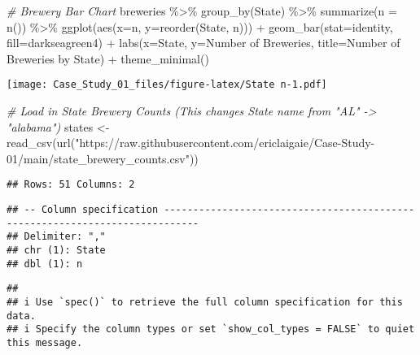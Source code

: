 \documentclass[
]{article}
\newenvironment{Shaded}{\begin{snugshade}}{\end{snugshade}}
\newcommand{\AttributeTok}[1]{\textcolor[rgb]{0.77,0.63,0.00}{#1}}
\newcommand{\CommentTok}[1]{\textcolor[rgb]{0.56,0.35,0.01}{\textit{#1}}}
\newcommand{\FunctionTok}[1]{\textcolor[rgb]{0.00,0.00,0.00}{#1}}
\newcommand{\NormalTok}[1]{#1}
\newcommand{\OtherTok}[1]{\textcolor[rgb]{0.56,0.35,0.01}{#1}}
\newcommand{\SpecialCharTok}[1]{\textcolor[rgb]{0.00,0.00,0.00}{#1}}
\newcommand{\StringTok}[1]{\textcolor[rgb]{0.31,0.60,0.02}{#1}}
\begin{document}
\begin{Shaded}
\begin{Highlighting}[]
\CommentTok{\# Brewery Bar Chart}
\NormalTok{breweries }\SpecialCharTok{\%\textgreater{}\%}
  \FunctionTok{group\_by}\NormalTok{(State) }\SpecialCharTok{\%\textgreater{}\%}
  \FunctionTok{summarize}\NormalTok{(}\AttributeTok{n =} \FunctionTok{n}\NormalTok{()) }\SpecialCharTok{\%\textgreater{}\%}
  \FunctionTok{ggplot}\NormalTok{(}\FunctionTok{aes}\NormalTok{(}\AttributeTok{x=}\NormalTok{n, }\AttributeTok{y=}\FunctionTok{reorder}\NormalTok{(State, n))) }\SpecialCharTok{+} 
  \FunctionTok{geom\_bar}\NormalTok{(}\AttributeTok{stat=}\StringTok{\textquotesingle{}identity\textquotesingle{}}\NormalTok{, }\AttributeTok{fill=}\StringTok{\textquotesingle{}darkseagreen4\textquotesingle{}}\NormalTok{) }\SpecialCharTok{+} 
  \FunctionTok{labs}\NormalTok{(}\AttributeTok{x=}\StringTok{\textquotesingle{}State\textquotesingle{}}\NormalTok{, }\AttributeTok{y=}\StringTok{\textquotesingle{}Number of Breweries\textquotesingle{}}\NormalTok{, }\AttributeTok{title=}\StringTok{\textquotesingle{}Number of Breweries by State\textquotesingle{}}\NormalTok{) }\SpecialCharTok{+} 
  \FunctionTok{theme\_minimal}\NormalTok{()}
\end{Highlighting}
\end{Shaded}

\texttt{[image: Case\_Study\_01\_files/figure-latex/State n-1.pdf]}

\begin{Shaded}
\begin{Highlighting}[]
\CommentTok{\# Load in State Brewery Counts (This changes State name from "AL" {-}\textgreater{} "alabama")}
\NormalTok{states }\OtherTok{\textless{}{-}} \FunctionTok{read\_csv}\NormalTok{(}\FunctionTok{url}\NormalTok{(}\StringTok{"https://raw.githubusercontent.com/ericlaigaie/Case{-}Study{-}01/main/state\_brewery\_counts.csv"}\NormalTok{))}
\end{Highlighting}
\end{Shaded}

\begin{verbatim}
## Rows: 51 Columns: 2
\end{verbatim}

\begin{verbatim}
## -- Column specification ----------------------------------------------------------------------------
## Delimiter: ","
## chr (1): State
## dbl (1): n
\end{verbatim}

\begin{verbatim}
## 
## i Use `spec()` to retrieve the full column specification for this data.
## i Specify the column types or set `show_col_types = FALSE` to quiet this message.
\end{verbatim}
\end{document}
